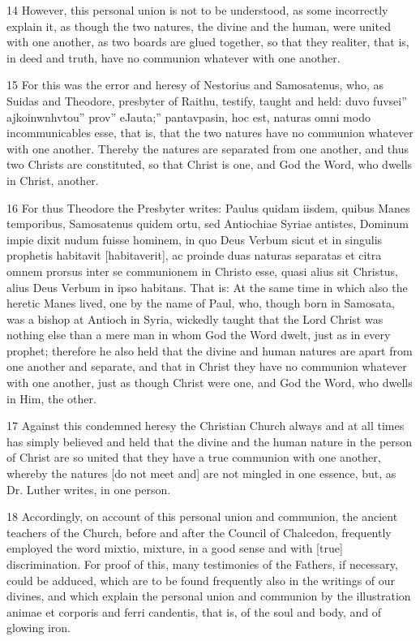 14 However, this personal union is not to be understood, as some incorrectly explain it, as though the two natures, the divine and the human, were united with one another, as two boards are glued together, so that they realiter, that is, in deed and truth, have no communion whatever with one another.

15 For this was the error and heresy of Nestorius and Samosatenus, who, as Suidas and Theodore, presbyter of Raithu, testify, taught and held: duvo fuvsei” ajkoinwnhvtou” prov” eJauta;” pantavpasin, hoc est, naturas omni modo incommunicables esse, that is, that the two natures have no communion whatever with one another. Thereby the natures are separated from one another, and thus two Christs are constituted, so that Christ is one, and God the Word, who dwells in Christ, another.

16 For thus Theodore the Presbyter writes: Paulus quidam iisdem, quibus Manes temporibus, Samosatenus quidem ortu, sed Antiochiae Syriae antistes, Dominum impie dixit nudum fuisse hominem, in quo Deus Verbum sicut et in singulis prophetis habitavit [habitaverit], ac proinde duas naturas separatas et citra omnem prorsus inter se communionem in Christo esse, quasi alius sit Christus, alius Deus Verbum in ipso habitans. That is: At the same time in which also the heretic Manes lived, one by the name of Paul, who, though born in Samosata, was a bishop at Antioch in Syria, wickedly taught that the Lord Christ was nothing else than a mere man in whom God the Word dwelt, just as in every prophet; therefore he also held that the divine and human natures are apart from one another and separate, and that in Christ they have no communion whatever with one another, just as though Christ were one, and God the Word, who dwells in Him, the other.

17 Against this condemned heresy the Christian Church always and at all times has simply believed and held that the divine and the human nature in the person of Christ are so united that they have a true communion with one another, whereby the natures [do not meet and] are not mingled in one essence, but, as Dr. Luther writes, in one person.

18 Accordingly, on account of this personal union and communion, the ancient teachers of the Church, before and after the Council of Chalcedon, frequently employed the word mixtio, mixture, in a good sense and with [true] discrimination. For proof of this, many testimonies of the Fathers, if necessary, could be adduced, which are to be found frequently also in the writings of our divines, and which explain the personal union and communion by the illustration animae et corporis and ferri candentis, that is, of the soul and body, and of glowing iron.

